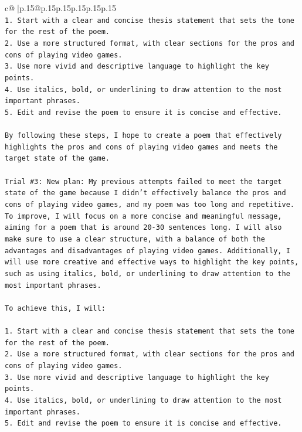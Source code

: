 \documentclass{article}
\begin{document}
{\begin{supertabular}{c@{$\;$}|p{.15\linewidth}@{}p{.15\linewidth}p{.15\linewidth}p{.15\linewidth}p{.15\linewidth}p{.15\linewidth}}
{{{\\ 
\texttt{1. Start with a clear and concise thesis statement that sets the tone for the rest of the poem.} \\
\texttt{2. Use a more structured format, with clear sections for the pros and cons of playing video games.} \\
\texttt{3. Use more vivid and descriptive language to highlight the key points.} \\
\texttt{4. Use italics, bold, or underlining to draw attention to the most important phrases.} \\
\texttt{5. Edit and revise the poem to ensure it is concise and effective.} \\
\\ 
\texttt{By following these steps, I hope to create a poem that effectively highlights the pros and cons of playing video games and meets the target state of the game.} \\
\\ 
\texttt{Trial \#3: New plan: My previous attempts failed to meet the target state of the game because I didn't effectively balance the pros and cons of playing video games, and my poem was too long and repetitive. To improve, I will focus on a more concise and meaningful message, aiming for a poem that is around 20{-}30 sentences long. I will also make sure to use a clear structure, with a balance of both the advantages and disadvantages of playing video games. Additionally, I will use more creative and effective ways to highlight the key points, such as using italics, bold, or underlining to draw attention to the most important phrases.} \\
\\ 
\texttt{To achieve this, I will:} \\
\\ 
\texttt{1. Start with a clear and concise thesis statement that sets the tone for the rest of the poem.} \\
\texttt{2. Use a more structured format, with clear sections for the pros and cons of playing video games.} \\
\texttt{3. Use more vivid and descriptive language to highlight the key points.} \\
\texttt{4. Use italics, bold, or underlining to draw attention to the most important phrases.} \\
\texttt{5. Edit and revise the poem to ensure it is concise and effective.} \\
\\ 
}}}
\end{supertabular}}
\end{document}
